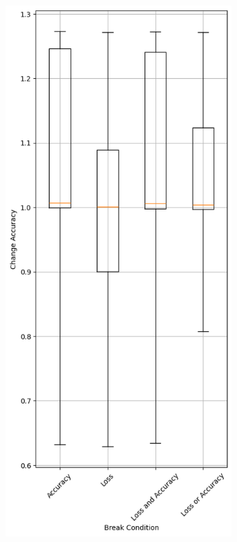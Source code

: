\begin{figure}
    \begin{subfigure}{0.5\textwidth}
        \centering
        \includegraphics[width=0.95\textwidth]{plots/BreakCondition_NotTrained_accuracy.png}

\end{subfigure}
\end{figure}
